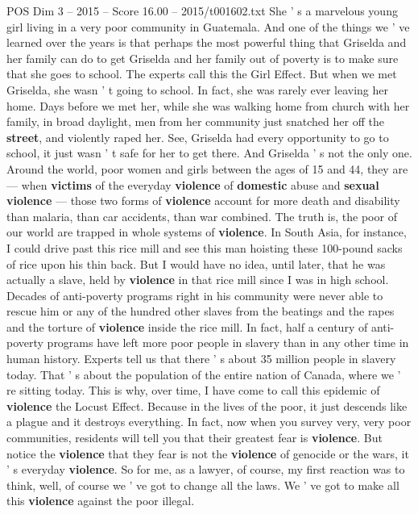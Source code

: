 \begin{textsample}{POS Dim 3 – 2015 – Score 16.00 – 2015/t001602.txt}
She ' s a marvelous young girl living in a very poor community in Guatemala.
And one of the things we ' ve learned over the years is that perhaps the most powerful thing that Griselda and her family can do to get Griselda and her family out of poverty is to make sure that she goes to school.
The experts call this the Girl Effect.
But when we met Griselda, she wasn ' t going to school.
In fact, she was rarely ever leaving her home.
Days before we met her, while she was walking home from church with her family, in broad daylight, men from her community just snatched her off the \textbf{street}, and violently raped her.
See, Griselda had every opportunity to go to school, it just wasn ' t safe for her to get there.
And Griselda ' s not the only one.
Around the world, poor women and girls between the ages of 15 and 44, they are — when \textbf{victims} of the everyday \textbf{violence} of \textbf{domestic} abuse and \textbf{sexual} \textbf{violence} — those two forms of \textbf{violence} account for more death and disability than malaria, than car accidents, than war combined.
The truth is, the poor of our world are trapped in whole systems of \textbf{violence}.
In South Asia, for instance, I could drive past this rice mill and see this man hoisting these 100-pound sacks of rice upon his thin back.
But I would have no idea, until later, that he was actually a slave, held by \textbf{violence} in that rice mill since I was in high school.
Decades of anti-poverty programs right in his community were never able to rescue him or any of the hundred other slaves from the beatings and the rapes and the torture of \textbf{violence} inside the rice mill.
In fact, half a century of anti-poverty programs have left more poor people in slavery than in any other time in human history.
Experts tell us that there ' s about 35 million people in slavery today.
That ' s about the population of the entire nation of Canada, where we ' re sitting today.
This is why, over time, I have come to call this epidemic of \textbf{violence} the Locust Effect.
Because in the lives of the poor, it just descends like a plague and it destroys everything.
In fact, now when you survey very, very poor communities, residents will tell you that their greatest fear is \textbf{violence}.
But notice the \textbf{violence} that they fear is not the \textbf{violence} of genocide or the wars, it ' s everyday \textbf{violence}.
So for me, as a lawyer, of course, my first reaction was to think, well, of course we ' ve got to change all the laws.
We ' ve got to make all this \textbf{violence} against the poor illegal.

\end{textsample}
